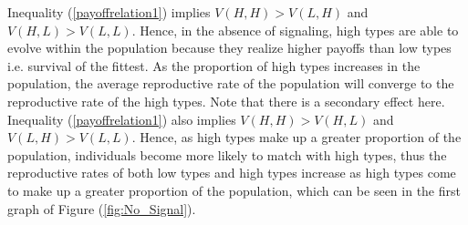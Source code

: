 Inequality (\ref{payoffrelation1}) implies $V(H,H)>V(L,H)$ and $V(H,L)>V(L,L)$. Hence, in the absence of signaling, high types are able to evolve within the population because they realize higher payoffs than low types i.e. survival of the fittest. As the proportion of high types increases in the population, the average reproductive rate of the population will converge to the reproductive rate of the high types. Note that there is a secondary effect here. Inequality (\ref{payoffrelation1}) also implies $V(H,H)>V(H,L)$ and $V(L,H)>V(L,L)$. Hence, as high types make up a greater proportion of the population, individuals become more likely to match with high types, thus the reproductive rates of both low types and high types increase as high types come to make up a greater proportion of the population, which can be seen in the first graph of Figure (\ref{fig:No_Signal}). 
